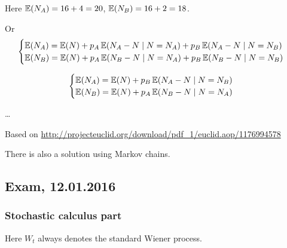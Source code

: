 \documentclass[12pt, a4paper]{article}
\begin{document}
\begin{enumerate}
Here $\operatorname{\mathbb{E}}(N_A) = 16 + 4 =20$, $\operatorname{\mathbb{E}}(N_B) = 16 + 2 =18$.

Or
\[
\begin{cases}
\operatorname{\mathbb{E}}(N_A) = \operatorname{\mathbb{E}}(N) + p_A\operatorname{\mathbb{E}}(N_A - N \mid N=N_A) + p_B \operatorname{\mathbb{E}}(N_A - N \mid N=N_B) \\
\operatorname{\mathbb{E}}(N_B) = \operatorname{\mathbb{E}}(N) + p_A\operatorname{\mathbb{E}}(N_B - N \mid N=N_A) + p_B \operatorname{\mathbb{E}}(N_B - N \mid N=N_B) \\
\end{cases}
\]

\[
\begin{cases}
\operatorname{\mathbb{E}}(N_A) = \operatorname{\mathbb{E}}(N) + p_B \operatorname{\mathbb{E}}(N_A - N \mid N=N_B) \\
\operatorname{\mathbb{E}}(N_B) = \operatorname{\mathbb{E}}(N) + p_A \operatorname{\mathbb{E}}(N_B - N \mid N=N_A)  \\
\end{cases}
\]

\ldots

Based on \url{http://projecteuclid.org/download/pdf_1/euclid.aop/1176994578}

There is also a solution using Markov chains.

\end{enumerate}



\subsection{Exam, 12.01.2016}

\subsubsection*{Stochastic calculus part}

Here $W_t$ always denotes the standard Wiener process.

\vspace{10pt}
\end{document}
